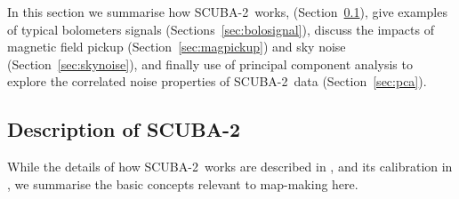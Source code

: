 \documentclass[useAMS,usenatbib,nofootinbib]{mn2e}
\newcommand{\scuba}{SCUBA-2}
\begin{document}
In this section we summarise how \scuba\ works,
(Section~\ref{sec:bolos}), give examples of typical bolometers signals
(Sections~\ref{sec:bolosignal}), discuss the impacts of magnetic field
pickup (Section~\ref{sec:magpickup}) and sky noise
(Section~\ref{sec:skynoise}), and finally use of principal component
analysis to explore the correlated noise properties of \scuba\ data
(Section~\ref{sec:pca}).

\subsection{Description of \scuba}
\label{sec:bolos}

While the details of how \scuba\ works are described in
\citet{holland2012}, and its calibration in \citet{dempsey2012}, we
summarise the basic concepts relevant to map-making here.
\end{document}
